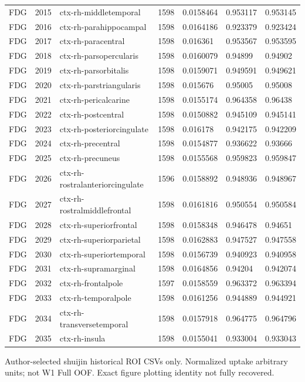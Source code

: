 \begin{landscape}
\begin{longtable}{lllllll}
FDG & 2015 & ctx-rh-middletemporal & 1598 & 0.0158464 & 0.953117 & 0.953145 \\
FDG & 2016 & ctx-rh-parahippocampal & 1598 & 0.0164186 & 0.923379 & 0.923424 \\
FDG & 2017 & ctx-rh-paracentral & 1598 & 0.016361 & 0.953567 & 0.953595 \\
FDG & 2018 & ctx-rh-parsopercularis & 1598 & 0.0160079 & 0.94899 & 0.94902 \\
FDG & 2019 & ctx-rh-parsorbitalis & 1598 & 0.0159071 & 0.949591 & 0.949621 \\
FDG & 2020 & ctx-rh-parstriangularis & 1598 & 0.015676 & 0.95005 & 0.95008 \\
FDG & 2021 & ctx-rh-pericalcarine & 1598 & 0.0155174 & 0.964358 & 0.96438 \\
FDG & 2022 & ctx-rh-postcentral & 1598 & 0.0150882 & 0.945109 & 0.945141 \\
FDG & 2023 & ctx-rh-posteriorcingulate & 1598 & 0.016178 & 0.942175 & 0.942209 \\
FDG & 2024 & ctx-rh-precentral & 1598 & 0.0154877 & 0.936622 & 0.93666 \\
FDG & 2025 & ctx-rh-precuneus & 1598 & 0.0155568 & 0.959823 & 0.959847 \\
FDG & 2026 & ctx-rh-rostralanteriorcingulate & 1596 & 0.0158892 & 0.948936 & 0.948967 \\
FDG & 2027 & ctx-rh-rostralmiddlefrontal & 1598 & 0.0161816 & 0.950554 & 0.950584 \\
FDG & 2028 & ctx-rh-superiorfrontal & 1598 & 0.0158348 & 0.946478 & 0.94651 \\
FDG & 2029 & ctx-rh-superiorparietal & 1598 & 0.0162883 & 0.947527 & 0.947558 \\
FDG & 2030 & ctx-rh-superiortemporal & 1598 & 0.0156739 & 0.940923 & 0.940958 \\
FDG & 2031 & ctx-rh-supramarginal & 1598 & 0.0164856 & 0.94204 & 0.942074 \\
FDG & 2032 & ctx-rh-frontalpole & 1597 & 0.0158559 & 0.963372 & 0.963394 \\
FDG & 2033 & ctx-rh-temporalpole & 1598 & 0.0161256 & 0.944889 & 0.944921 \\
FDG & 2034 & ctx-rh-transversetemporal & 1598 & 0.0157918 & 0.964775 & 0.964796 \\
FDG & 2035 & ctx-rh-insula & 1598 & 0.0155041 & 0.933004 & 0.933043 \\
\end{longtable}
\noindent\parbox{\linewidth}{\footnotesize Author-selected shuijin historical ROI CSVs only. Normalized uptake arbitrary units; not W1 Full OOF. Exact figure plotting identity not fully recovered.}
\endgroup
\end{landscape}
